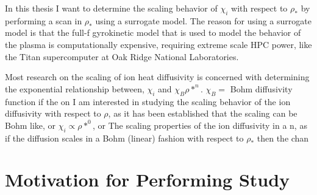 \documentclass{article}
\begin{document}
In this thesis I want to determine the scaling behavior of $\chi_i$ with respect to $\rho_*$ by performing a scan in $\rho_*$ using a surrogate model. The reason for using a surrogate model is that the full-f gyrokinetic model that is used to model the behavior of the plasma is computationally expensive, requiring extreme scale HPC power, like the Titan supercomputer at Oak Ridge National Laboratories.
%


Most research on the scaling of ion heat diffusivity is concerned with determining the exponential relationship between,  $\chi_i$ and $\chi_B\rho*^{n}$. $\chi_B = $ Bohm diffusivity function if the   on  I am interested in studying the scaling behavior of the ion diffusivity with respect to $\rho$, as it has been established that the scaling can be Bohm like, or $\chi_i \propto  \rho*^0$, or  The scaling properties of the ion diffusivity in a n, as if the diffusion scales in a Bohm (linear) fashion with respect to $\rho_*$ then the chan


\section{Motivation for Performing Study}
\end{document}
